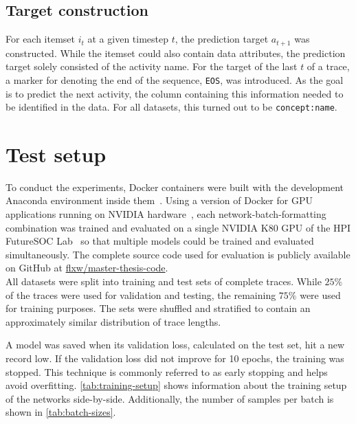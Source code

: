 \subsection*{Target construction}
For each itemset $i_t$ at a given timestep $t$, the prediction target $a_{t+1}$ was constructed. While the itemset could also contain data attributes, the prediction target solely consisted of the activity name. For the target of the last $t$ of a trace, a marker for denoting the end of the sequence, \verb=EOS=, was introduced.
As the goal is to predict the next activity, the column containing this information needed to be identified in the data. For all datasets, this turned out to be \verb=concept:name=.

\section{Test setup}
\label{sec:eval:test-setup}
To conduct the experiments, Docker containers were built with the development Anaconda environment inside them~\cite{web:docker}. Using a version of Docker for GPU applications running on NVIDIA hardware~\cite{web:nvidia-docker}, each network-batch-formatting combination was trained and evaluated on a single NVIDIA K80 GPU of the HPI FutureSOC Lab~\cite{web:fsoc} so that multiple models could be trained and evaluated simultaneously. The complete source code used for evaluation is publicly available on GitHub at \href{https://github.com/flxw/master-thesis-code}{flxw/master-thesis-code}.\\

All datasets were split into training and test sets of complete traces. While $25\%$ of the traces were used for validation and testing, the remaining $75\%$ were used for training purposes. The sets were shuffled and stratified to contain an approximately similar distribution of trace lengths.

A model was saved when its validation loss, calculated on the test set, hit a new record low. If the validation loss did not improve for 10 epochs, the training was stopped. This technique is commonly referred to as early stopping and helps avoid overfitting. \autoref{tab:training-setup} shows information about the training setup of the networks side-by-side. Additionally, the number of samples per batch is shown in \autoref{tab:batch-sizes}.

